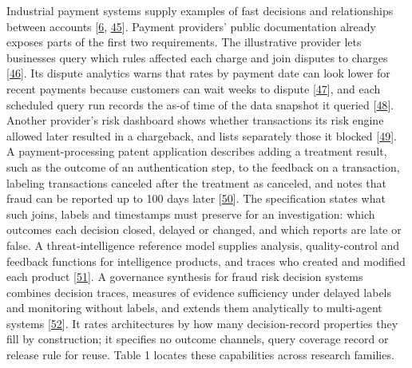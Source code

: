 \documentclass[
  11pt,
]{article}
\begin{document}
Industrial payment systems supply examples of fast decisions and
relationships between accounts
{[}\protect\hyperlink{ref-Cao2019TitAnt}{6},
\protect\hyperlink{ref-Liu2018GEM}{45}{]}. Payment providers' public
documentation already exposes parts of the first two requirements. The
illustrative provider lets businesses query which rules affected each
charge and join disputes to charges
{[}\protect\hyperlink{ref-Stripe2026QueryDisputes}{46}{]}. Its dispute
analytics warns that rates by payment date can look lower for recent
payments because customers can wait weeks to dispute
{[}\protect\hyperlink{ref-Stripe2026DisputeAnalytics}{47}{]}, and each
scheduled query run records the as-of time of the data snapshot it
queried {[}\protect\hyperlink{ref-Stripe2026SigmaRun}{48}{]}. Another
provider's risk dashboard shows whether transactions its risk engine
allowed later resulted in a chargeback, and lists separately those it
blocked {[}\protect\hyperlink{ref-Adyen2026RiskMonitoring}{49}{]}. A
payment-processing patent application describes adding a treatment
result, such as the outcome of an authentication step, to the feedback
on a transaction, labeling transactions canceled after the treatment as
canceled, and notes that fraud can be reported up to 100 days later
{[}\protect\hyperlink{ref-Erdbrink2023TreatmentPatent}{50}{]}. The
specification states what such joins, labels and timestamps must
preserve for an investigation: which outcomes each decision closed,
delayed or changed, and which reports are late or false. A
threat-intelligence reference model supplies analysis, quality-control
and feedback functions for intelligence products, and traces who created
and modified each product
{[}\protect\hyperlink{ref-Sakellariou2022CTIReferenceModel}{51}{]}. A
governance synthesis for fraud risk decision systems combines decision
traces, measures of evidence sufficiency under delayed labels and
monitoring without labels, and extends them analytically to multi-agent
systems {[}\protect\hyperlink{ref-Solozobov2026Synthesis}{52}{]}. It
rates architectures by how many decision-record properties they fill by
construction; it specifies no outcome channels, query coverage record or
release rule for reuse. Table 1 locates these capabilities across
research families.
\end{document}
